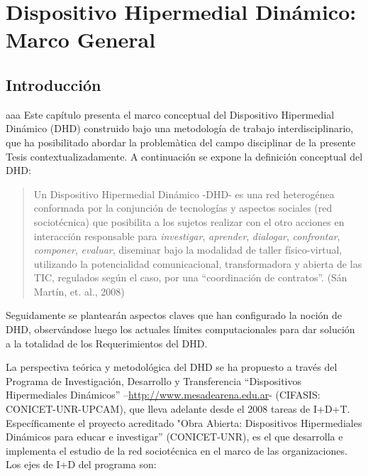 ﻿%

\chapter{Dispositivo Hipermedial Dinámico: Marco General} \label{dhd}

\section{Introducción}
aaa
Este capítulo presenta el marco conceptual del Dispositivo Hipermedial Dinámico (DHD) construido bajo una metodología de trabajo interdisciplinario, que ha posibilitado abordar la problemàtica del campo disciplinar de la presente Tesis contextualizadamente. A continuación se expone la definición conceptual del DHD:

\begin{quote} \label{definiciondhd}

Un Dispositivo Hipermedial Dinámico -DHD- es una red
heterogénea conformada por la conjunción de tecnologías y aspectos sociales (red sociotécnica) que
posibilita a los sujetos realizar con el otro acciones en interacción
responsable para \textit{investigar}, \textit{aprender}, \textit{dialogar},
\textit{confrontar}, \textit{componer}, \textit{evaluar}, diseminar bajo la
modalidad de taller físico-virtual, utilizando la potencialidad comunicacional,
transformadora y abierta de las TIC, regulados según el caso, por una
“coordinación de contratos”. (Sán Martín, et. al., 2008)
\end{quote} 

Seguidamente se plantearán aspectos claves que han configurado la noción de DHD, observándose luego los actuales límites computacionales para dar solución a la totalidad de los Requerimientos del DHD.

La perspectiva teórica y metodológica del DHD se ha propuesto a través del Programa de Investigación, Desarrollo y Transferencia
“Dispositivos Hipermediales Dinámicos” –\url{http://www.mesadearena.edu.ar}-
(CIFASIS: CONICET-UNR-UPCAM), que lleva adelante desde el 2008 tareas de I+D+T. Específicamente el proyecto acreditado "Obra Abierta: Dispositivos Hipermediales Dinámicos para educar e
investigar” (CONICET-UNR), es el que desarrolla e implementa el estudio de la red sociotécnica en el marco de las organizaciones. Los ejes de I+D del programa son:

